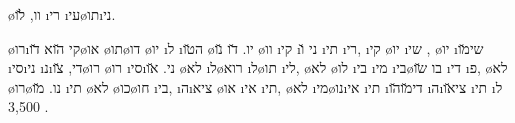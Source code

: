 \o{וו}, \u{לו}  \i{רי} \i{עי}\o{תו}\i{ני}.

 \o{רו}\i{קי} \u{הוא}  \u{דו}\o{או} \o{תו}\o{דו} \o{יו} \i{ל}  \i{ה}\u{טו} \o{יו}. \u{דו} \u{נו} \o{וו} \i{קי} \i{ני} \u{ו} \i{תי} \i{רי},  \i{קי}  \o{יו}  \i{שי} ,  \o{יו}  \i{שי}\u{מו} \i{סי}\i{ני} \i{נ}\i{די},  \u{צו}\o{רו}   \o{רו} \i{סי}\i{ני}. \u{או}  \o{לא}  \i{ל}\o{רוא} \i{ל}\o{תו} \i{לי}, \o{לא}  \o{לו} \i{בי} \i{מי}  \i{בי}\o{בו} \u{שו} \i{די}  \i{פ},  \o{לא}  \o{רו}\o{נו}.   \u{מו} \i{תי} \o{לא}  \o{כו}\o{חו} \i{בי},  \i{ה}\i{ציא} \o{או} \i{אי}  \i{תי}, \o{לא}  \i{מי}\o{נו}\i{אי}  \i{תי} \i{די}\u{מו}\u{הו} \i{ה}\i{צי}\u{או}  \i{תי}  \i{ל} 3,500 .

